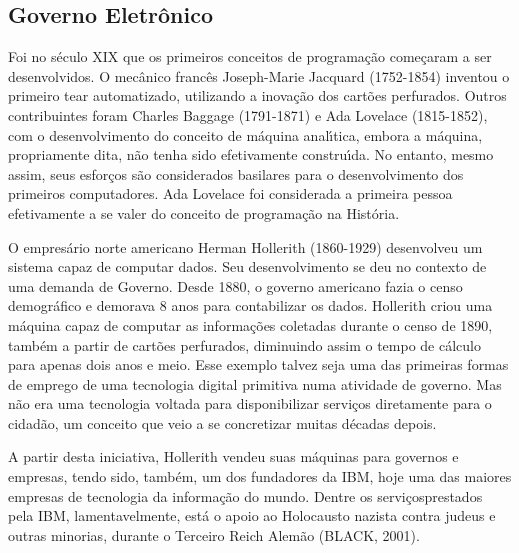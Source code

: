 \documentclass[
12pt,		%
openright,	%
twoside,  %
a4paper,			%
chapter=TITLE,		%
english,			%
french,				%
spanish,			%
brazil				%
]{USPSC-classe/USPSC}
\begin{document}
\subsection[Governo Eletr\^onico]{Governo Eletr\^onico}\label{Governo Eletr\^onico}
Foi no s\'eculo XIX que os primeiros conceitos de programa\c{c}\~ao come\c{c}aram a ser desenvolvidos. O mec\^anico franc\^es Joseph-Marie Jacquard (1752-1854) inventou o primeiro tear automatizado, utilizando a inova\c{c}\~ao dos cart\~oes perfurados. Outros contribuintes foram Charles Baggage (1791-1871) e Ada Lovelace (1815-1852), com o desenvolvimento do conceito de m\'aquina anal\'{\i}tica, embora a m\'aquina, propriamente dita, n\~ao tenha sido efetivamente constru\'{\i}da. No entanto, mesmo assim, seus esfor\c{c}os s\~ao considerados basilares para o desenvolvimento dos primeiros computadores. Ada Lovelace foi considerada a primeira pessoa efetivamente a se valer do conceito de programa\c{c}\~ao na Hist\'oria.









O empres\'ario norte americano Herman Hollerith (1860-1929) desenvolveu um sistema capaz de computar dados. Seu desenvolvimento se deu no contexto de uma demanda de Governo. Desde 1880, o governo americano fazia o censo demogr\'afico e demorava 8 anos para contabilizar os dados. Hollerith criou uma m\'aquina capaz de computar as informa\c{c}\~oes coletadas durante o censo de 1890, tamb\'em a partir de cart\~oes perfurados, diminuindo assim o tempo de c\'alculo para apenas dois anos e meio. Esse exemplo talvez seja uma das primeiras formas de emprego de uma tecnologia digital primitiva numa atividade de governo. Mas n\~ao era uma tecnologia voltada para disponibilizar servi\c{c}os diretamente para o cidad\~ao, um conceito que veio a se concretizar muitas d\'ecadas depois.









A partir desta iniciativa, Hollerith vendeu suas m\'aquinas para governos e empresas, tendo sido, tamb\'em, um dos fundadores da IBM, hoje uma das maiores empresas de tecnologia da informa\c{c}\~ao do mundo. Dentre os \textquotedbl servi\c{c}os\textquotedbl  prestados pela IBM, lamentavelmente, est\'a o apoio ao Holocausto nazista contra judeus e outras minorias, durante o Terceiro Reich Alem\~ao  (BLACK, 2001).
\end{document}
